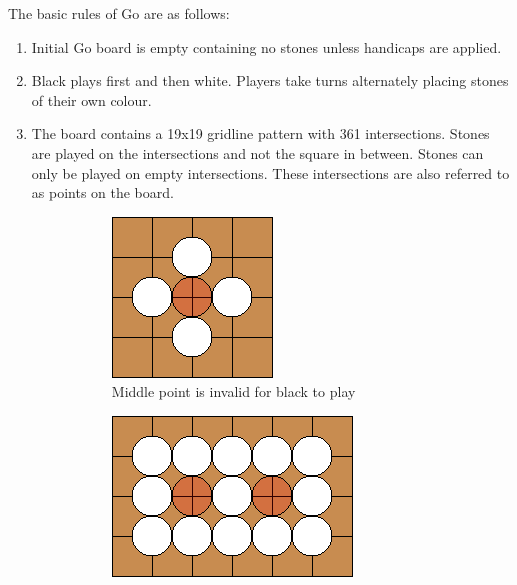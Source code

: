 \documentclass{l4proj}
\begin{document}
The basic rules of Go are as follows:
\begin{enumerate}

  \item Initial Go board is empty containing no stones unless handicaps are applied.
  \item Black plays first and then white. Players take turns alternately placing stones of their own colour.
  \item The board contains a 19x19 gridline pattern with 361 intersections. Stones are played on the intersections and not the square in between. Stones can only be played on empty intersections. These intersections are also referred to as points on the board.


  \begin{figure}[!ht]
  \centering
  \begin{subfigure}[t]{0.25\textwidth}
  \includegraphics[width=\textwidth]{ex/Ex2-0.png}
  \caption{Middle point is invalid for black to play}
  \label{fig:ex2-0}
  \end{subfigure}  \qquad\qquad\qquad
  \begin{subfigure}[t]{0.375\textwidth}
  \includegraphics[width=\textwidth]{ex/Ex2-1.png}

\end{subfigure}
\end{figure}
\end{enumerate}
\end{document}
